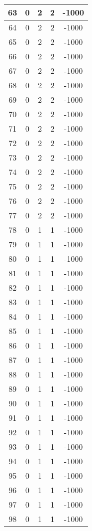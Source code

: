 \documentclass[letterpaper, 12pt]{article}
\begin{document}
\begin{longtable}{|c|c|c|c|c|}
\hline
63 & 0 & 2 & 2 & -1000 \\
\hline
64 & 0 & 2 & 2 & -1000 \\
\hline
65 & 0 & 2 & 2 & -1000 \\
\hline
66 & 0 & 2 & 2 & -1000 \\
\hline
67 & 0 & 2 & 2 & -1000 \\
\hline
68 & 0 & 2 & 2 & -1000 \\
\hline
69 & 0 & 2 & 2 & -1000 \\
\hline
70 & 0 & 2 & 2 & -1000 \\
\hline
71 & 0 & 2 & 2 & -1000 \\
\hline
72 & 0 & 2 & 2 & -1000 \\
\hline
73 & 0 & 2 & 2 & -1000 \\
\hline
74 & 0 & 2 & 2 & -1000 \\
\hline
75 & 0 & 2 & 2 & -1000 \\
\hline
76 & 0 & 2 & 2 & -1000 \\
\hline
77 & 0 & 2 & 2 & -1000 \\
\hline
78 & 0 & 1 & 1 & -1000 \\
\hline
79 & 0 & 1 & 1 & -1000 \\
\hline
80 & 0 & 1 & 1 & -1000 \\
\hline
81 & 0 & 1 & 1 & -1000 \\
\hline
82 & 0 & 1 & 1 & -1000 \\
\hline
83 & 0 & 1 & 1 & -1000 \\
\hline
84 & 0 & 1 & 1 & -1000 \\
\hline
85 & 0 & 1 & 1 & -1000 \\
\hline
86 & 0 & 1 & 1 & -1000 \\
\hline
87 & 0 & 1 & 1 & -1000 \\
\hline
88 & 0 & 1 & 1 & -1000 \\
\hline
89 & 0 & 1 & 1 & -1000 \\
\hline
90 & 0 & 1 & 1 & -1000 \\
\hline
91 & 0 & 1 & 1 & -1000 \\
\hline
92 & 0 & 1 & 1 & -1000 \\
\hline
93 & 0 & 1 & 1 & -1000 \\
\hline
94 & 0 & 1 & 1 & -1000 \\
\hline
95 & 0 & 1 & 1 & -1000 \\
\hline
96 & 0 & 1 & 1 & -1000 \\
\hline
97 & 0 & 1 & 1 & -1000 \\
\hline
98 & 0 & 1 & 1 & -1000 \\

\end{longtable}
\end{document}
